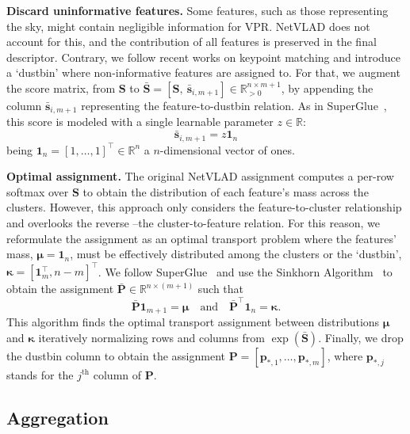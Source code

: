 \documentclass[10pt,twocolumn,letterpaper]{article}
\begin{document}
\textbf{Discard uninformative features.} Some features, such as those representing the sky, might contain negligible information for VPR. NetVLAD does not account for this, and the contribution of all features is preserved in the final descriptor. Contrary, we follow recent works on keypoint matching and introduce a `dustbin' where non-informative features are assigned to. For that, we augment the score matrix, from $\textbf{S}$ to $\bar{\textbf{S}} = \left[ \textbf{S}, \ \bar{\textbf{s}}_{i, m+1}\right] \in \mathbb{R}_{>0}^{n \times m+1}$, by appending the column $\bar{\textbf{s}}_{i, m+1}$ representing the feature-to-dustbin relation. As in SuperGlue~\cite{sarlin2020superglue}, this score is modeled with a single learnable parameter $z \in \mathbb{R}$:
\begin{equation}
\bar{\textbf{s}}_{i, m+1} = z\textbf{1}_{n}
\end{equation}
\noindent being $\textbf{1}_{n} = \left[1, \dots, 1\right]^\top \in \mathbb{R}^n$ a $n$-dimensional vector of ones.

\textbf{Optimal assignment.} The original NetVLAD assignment computes a per-row softmax over $\mathbf{S}$ to obtain the distribution of each feature's mass across the clusters. However, this approach only considers the feature-to-cluster relationship and overlooks the reverse --the cluster-to-feature relation. For this reason, we reformulate the assignment as an optimal transport problem where the features' mass, $\boldsymbol {\mu}=\mathbf{1}_n$, must be effectively distributed among the clusters or the `dustbin', $\boldsymbol{\kappa}=[\mathbf{1}^\top_m, n-m]^\top$. We follow SuperGlue~\cite{sarlin2020superglue} and use the Sinkhorn Algorithm~\cite{cuturi2013sinkhorn,sinkhorn1967concerning} to obtain the assignment $\bar{\textbf{P}} \in \mathbb{R}^{n \times \left(m+1\right)}$ such that
\begin{equation}
    \bar{\textbf{P}}\textbf{1}_{m+1} = \boldsymbol {\mu}\quad\text{and}\quad \bar{\textbf{P}}^\top\textbf{1}_{n} = \boldsymbol {\kappa}\text{.}
\end{equation}
This algorithm finds the optimal transport assignment between distributions $\boldsymbol{\mu}$ and $\boldsymbol{\kappa}$ iteratively normalizing rows and columns from $\exp\left(\bar{\textbf{S}}\right)$. Finally, we drop the dustbin column to obtain the assignment $\textbf{P} = \left[ \textbf{p}_{\ast,1}, \dots, \textbf{p}_{\ast,m} \right]$, where $\textbf{p}_{\ast,j}$ stands for the $j^{\text{th}}$ column of $\textbf{P}$.

\subsection{Aggregation}
\label{subsec:aggregation}
\end{document}
